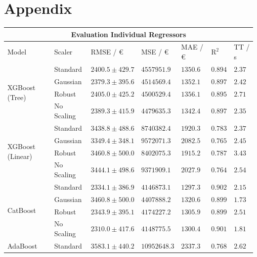 \section{Appendix}
\label{sec:Appendix}

\begin{table}[h!]
    \centering
      \begin{tabular}{ |p{2cm}||p{2cm}||p{2.9cm}|p{1.9cm}|p{1.7cm}|p{1cm}|p{1.2cm}|  }
        \hline
        \multicolumn{7}{|c|}{Evaluation Individual Regressors} \\
        \hline
        Model & Scaler & RMSE / €  & MSE / €  & MAE / € & $ \mathrm{R}^2 $& TT / s\\
        \hline
        \multirow{4}{2cm}{XGBoost (Tree)} & Standard & $2400.5 \pm  429.7$ & $4557951.9$ & $1350.6$ & $0.894$ & $2.37$\\
        & \cellcolor[HTML]{FFFACD} Gaussian  & \cellcolor[HTML]{FFFACD} $2379.3 \pm  395.6$ & $4514569.4$ & \cellcolor[HTML]{FFFACD} $1352.1$ & \cellcolor[HTML]{FFFACD} $0.897$ & $2.42$\\
        & Robust & $2405.0 \pm  425.2$ & $4500529.4$ & $1356.1$ & $0.895$ & $2.71$\\
        & No Scaling & $2389.3 \pm  415.9$ & $4479635.3$ & $1342.4$ & $0.897$ & $2.35$\\
        \hline  
        \multirow{4}{2cm}{XGBoost (Linear)} & Standard & $3438.8 \pm  488.6$ & $8740382.4$ & $1920.3$ & $0.783$ & $2.37$\\
        & Gaussian  & $3349.4 \pm  348.1$ & $9572071.3$ & $2082.5$ & $0.765$ & $2.45$\\
        & Robust & $3460.8 \pm  500.0$ & $8402075.3$ & $1915.2$ & $0.787$ & $3.43$\\
        & No Scaling & $3444.1 \pm  498.6$ & $9371909.1$ & $2027.9$ & $0.764$ & $2.54$\\
        \hline  
        \multirow{4}{2cm}{CatBoost} & \cellcolor[HTML]{98FB98} Standard & \cellcolor[HTML]{FFFACD} $2334.1 \pm  386.9$ & $4146873.1$ & \cellcolor[HTML]{FFFACD} $1297.3$ & \cellcolor[HTML]{FFFACD} $0.902$ & $2.15$\\
        & Gaussian  & $3460.8 \pm  500.0$ & $4407888.2$ & $1320.6$ & $0.899$ & $1.73$\\
        & Robust & $2343.9 \pm 395.1$ & $4174227.2$ & $1305.9$ & $0.899$ & $2.51$\\
        & No Scaling & $2310.0 \pm  417.6$ & $4148775.5$ & $1300.4$ & $0.901$ & $1.81$\\
        \hline
        \multirow{4}{2cm}{AdaBoost} & Standard & $3583.1 \pm  440.2$ & $10952648.3$ & $2337.3$ & $0.768$ & $2.62$\\

\end{tabular}
\end{table}
